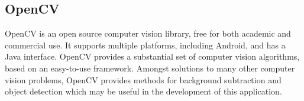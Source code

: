\subsection{OpenCV}

OpenCV\cite{opencv} is an open source computer vision library, free for both academic and commercial use. It supports multiple platforms, including Android, and has a Java interface. OpenCV provides a substantial set of computer vision algorithms, based on an easy-to-use framework. Amongst solutions to many other computer vision problems, OpenCV provides methods for background subtraction and object detection which may be useful in the development of this application.
